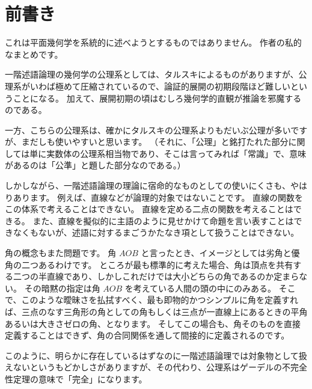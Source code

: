 \chapter*{前書き}

これは平面幾何学を系統的に述べようとするものではありません。
作者の私的なまとめです。

一階述語論理の幾何学の公理系としては、タルスキによるものがありますが、公理系がいわば極めて圧縮されているので、論証的展開の初期段階ほど難しいということになる。
加えて、展開初期の頃はむしろ幾何学的直観が推論を邪魔するのである。

一方、こちらの公理系は、確かにタルスキの公理系よりもだいぶ公理が多いですが、まだしも使いやすいと思います。
（それに、「公理」と銘打たれた部分に関しては単に実数体の公理系相当物であり、そこは言ってみれば「常識」で、意味があるのは「公準」と題した部分なのである。）

しかしながら、一階述語論理の理論に宿命的なものとしての使いにくさも、やはりあります。
例えば、直線などが論理的対象ではないことです。
直線の関数をこの体系で考えることはできない。
直線を定める二点の関数を考えることはできる。
また、直線を擬似的に主語のように見せかけて命題を言い表すことはできなくもないが、述語に対するまごうかたなき項として扱うことはできない。

角の概念もまた問題です。
角 \(AOB\) と言ったとき、イメージとしては劣角と優角の二つあるわけです。
ところが最も標準的に考えた場合、角は頂点を共有する二つの半直線であり、しかしこれだけでは大小どちらの角であるのか定まらない。
その暗黙の指定は角 \(AOB\) を考えている人間の頭の中にのみある。
そこで、このような曖昧さを払拭すべく、最も即物的かつシンプルに角を定義すれば、三点のなす三角形の角としての角もしくは三点が一直線上にあるときの平角あるいは大きさゼロの角、となります。
そしてこの場合も、角そのものを直接定義することはできず、角の合同関係を通して間接的に定義されるのです。

このように、明らかに存在しているはずなのに一階述語論理では対象物として扱えないというもどかしさがありますが、その代わり、公理系はゲーデルの不完全性定理の意味で「完全」になります。
